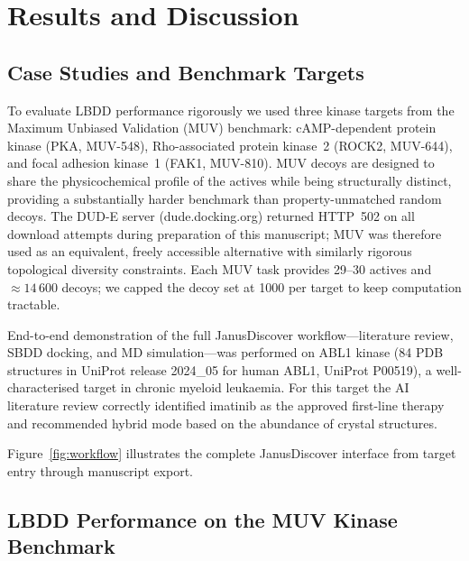 \documentclass[journal=jcisd8,manuscript=article]{achemso}
\begin{document}
\section{Results and Discussion}

\subsection{Case Studies and Benchmark Targets}

To evaluate LBDD performance rigorously we used three kinase targets from the
Maximum Unbiased Validation (MUV) benchmark\cite{rohrer2009muv}: cAMP-dependent
protein kinase (PKA, MUV-548), Rho-associated protein kinase~2 (ROCK2, MUV-644),
and focal adhesion kinase~1 (FAK1, MUV-810).  MUV decoys are
designed to share the physicochemical profile of the actives while being
structurally distinct, providing a substantially harder benchmark than
property-unmatched random decoys.\cite{mysinger2012dud}  The DUD-E server
(dude.docking.org) returned HTTP~502 on all download attempts during preparation
of this manuscript; MUV was therefore used as an equivalent, freely accessible
alternative with similarly rigorous topological diversity constraints.
Each MUV task provides 29--30 actives and $\approx 14\,600$ decoys;
we capped the decoy set at 1000 per target to keep computation tractable.

End-to-end demonstration of the full JanusDiscover workflow---literature
review, SBDD docking, and MD simulation---was performed on ABL1 kinase
(84 PDB structures in UniProt release 2024\_05 for human ABL1, UniProt P00519),
a well-characterised target in
chronic myeloid leukaemia.\cite{nagar2002structural}  For this target the
AI literature review correctly identified imatinib as the approved first-line
therapy and recommended hybrid mode based on the abundance of crystal
structures.

Figure~\ref{fig:workflow} illustrates the complete JanusDiscover
interface from target entry through manuscript export.

\subsection{LBDD Performance on the MUV Kinase Benchmark}
\end{document}
